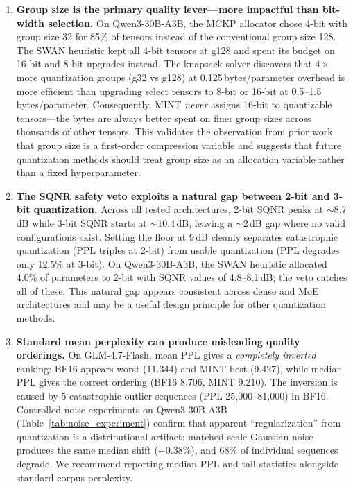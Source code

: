 \documentclass{article}
\begin{document}
\begin{enumerate}

\item \textbf{Group size is the primary quality lever---more impactful than bit-width selection.}
On Qwen3-30B-A3B, the MCKP allocator chose 4-bit with group size 32 for 85\% of tensors instead of the conventional group size 128. The SWAN heuristic kept all 4-bit tensors at g128 and spent its budget on 16-bit and 8-bit upgrades instead. The knapsack solver discovers that $4\times$ more quantization groups (g32 vs g128) at 0.125\,bytes/parameter overhead is more efficient than upgrading select tensors to 8-bit or 16-bit at 0.5--1.5\,bytes/parameter. Consequently, MINT \emph{never} assigns 16-bit to quantizable tensors---the bytes are always better spent on finer group sizes across thousands of other tensors. This validates the observation from prior work~\cite{li2025mixllm} that group size is a first-order compression variable and suggests that future quantization methods should treat group size as an allocation variable rather than a fixed hyperparameter.

\item \textbf{The SQNR safety veto exploits a natural gap between 2-bit and 3-bit quantization.}
Across all tested architectures, 2-bit SQNR peaks at ${\sim}$8.7\,dB while 3-bit SQNR starts at ${\sim}$10.4\,dB, leaving a ${\sim}$2\,dB gap where no valid configurations exist. Setting the floor at 9\,dB cleanly separates catastrophic quantization (PPL triples at 2-bit) from usable quantization (PPL degrades only 12.5\% at 3-bit). On Qwen3-30B-A3B, the SWAN heuristic allocated 4.0\% of parameters to 2-bit with SQNR values of 4.8--8.1\,dB; the veto catches all of these. This natural gap appears consistent across dense and MoE architectures and may be a useful design principle for other quantization methods.

\item \textbf{Standard mean perplexity can produce misleading quality orderings.}
On GLM-4.7-Flash, mean PPL gives a \emph{completely inverted} ranking: BF16 appears worst (11.344) and MINT best (9.427), while median PPL gives the correct ordering (BF16 8.706, MINT 9.210). The inversion is caused by 5 catastrophic outlier sequences (PPL 25{,}000--81{,}000) in BF16. Controlled noise experiments on Qwen3-30B-A3B (Table~\ref{tab:noise_experiment}) confirm that apparent ``regularization'' from quantization is a distributional artifact: matched-scale Gaussian noise produces the same median shift ($-0.38\%$), and 68\% of individual sequences degrade. We recommend reporting median PPL and tail statistics alongside standard corpus perplexity.


\end{enumerate}
\end{document}

